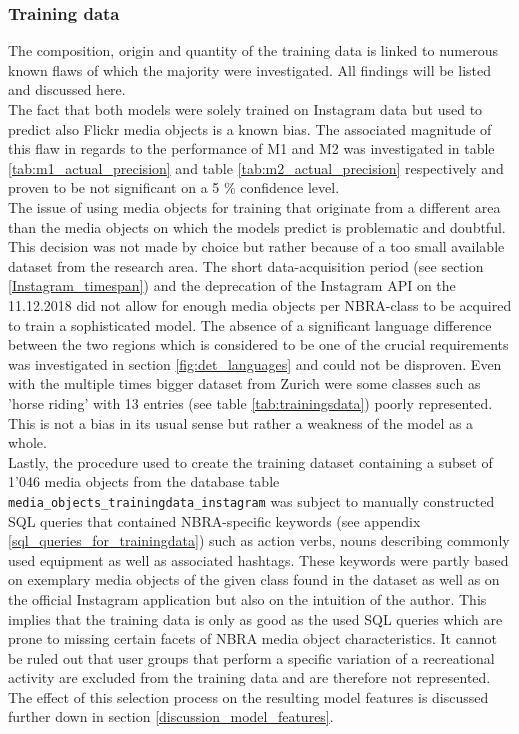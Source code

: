 \subsubsection{Training data} The composition, origin and quantity of the training data is linked to numerous known flaws of which the majority were investigated. All findings will be listed and discussed here. \\
The fact that both models were solely trained on Instagram data but used to predict also Flickr media objects is a known bias. The associated magnitude of this flaw in regards to the performance of M1 and M2 was investigated in table \ref{tab:m1_actual_precision} and table \ref{tab:m2_actual_precision} respectively and proven to be not significant on a 5 \% confidence level. \\
The issue of using media objects for training that originate from a different area than the media objects on which the models predict is problematic and doubtful. This decision was not made by choice but rather because of a too small available dataset from the research area. The short data-acquisition period (see section \ref{Instagram_timespan}) and the deprecation of the Instagram API on the 11.12.2018 did not allow for enough media objects per NBRA-class to be acquired to train a sophisticated model. The absence of a significant language difference between the two regions which is considered to be one of the crucial requirements was investigated in section \ref{fig:det_languages} and could not be disproven. Even with the multiple times bigger dataset from Zurich were some classes such as 'horse riding' with 13 entries (see table \ref{tab:trainingsdata}) poorly represented. This is not a bias in its usual sense but rather a weakness of the model as a whole. \\
Lastly, the procedure used to create the training dataset containing a subset of 1'046 media objects from the database table \texttt{media\_objects\_trainingdata\_instagram} was subject to manually constructed SQL queries that contained NBRA-specific keywords (see appendix \ref{sql_queries_for_trainingdata}) such as action verbs, nouns describing commonly used equipment as well as associated hashtags. These keywords were partly based on exemplary media objects of the given class found in the dataset as well as on the official Instagram application but also on the intuition of the author. This implies that the training data is only as good as the used SQL queries which are prone to missing certain facets of NBRA media object characteristics. It cannot be ruled out that user groups that perform a specific variation of a recreational activity are excluded from the training data and are therefore not represented. The effect of this selection process on the resulting model features is discussed further down in section \ref{discussion_model_features}.

